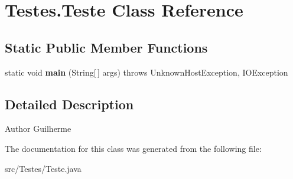 \hypertarget{class_testes_1_1_teste}{\section{Testes.\+Teste Class Reference}
\label{class_testes_1_1_teste}
}
\subsection*{Static Public Member Functions}
\begin{DoxyCompactItemize}
\item 
\hypertarget{class_testes_1_1_teste_ade4eedcbf7d956bd3f3ce42e1f917fb6}{static void {\bfseries main} (String\mbox{[}$\,$\mbox{]} args)  throws Unknown\+Host\+Exception, I\+O\+Exception }\label{class_testes_1_1_teste_ade4eedcbf7d956bd3f3ce42e1f917fb6}

\end{DoxyCompactItemize}


\subsection{Detailed Description}
\begin{DoxyAuthor}{Author}
Guilherme 
\end{DoxyAuthor}


The documentation for this class was generated from the following file\+:\begin{DoxyCompactItemize}
\item 
src/\+Testes/Teste.\+java\end{DoxyCompactItemize}
